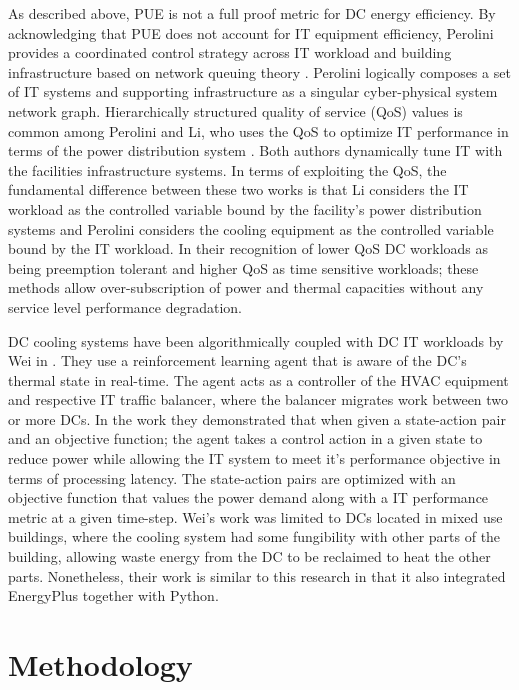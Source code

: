 As described above, PUE is not a full proof metric for DC energy efficiency. By acknowledging that PUE does not account for IT equipment efficiency, Perolini provides a coordinated control strategy across IT workload and building infrastructure based on network queuing theory \citep{parolini12}. Perolini logically composes a set of IT systems and supporting infrastructure as a singular cyber-physical system network graph. Hierarchically structured quality of service (QoS) values is common among Perolini and Li, who uses the QoS to optimize IT performance in terms of the power distribution system \citep{Li18}. Both authors dynamically tune IT with the facilities infrastructure systems. In terms of exploiting the QoS,  the fundamental difference between these two works is that Li considers the IT workload as the controlled variable bound by the facility's power distribution systems and Perolini considers the cooling equipment as the controlled variable bound by the IT workload. In their recognition of lower QoS DC workloads as being preemption tolerant and higher QoS as time sensitive workloads; these methods allow over-subscription of power and thermal capacities without any service level performance degradation. 

DC cooling systems have been algorithmically coupled with DC IT workloads by Wei in \citep{wei17}. They use a reinforcement learning agent that is aware of the DC's thermal state in real-time. The agent acts as a controller of the HVAC equipment and respective IT traffic balancer, where the balancer migrates work between two or more DCs. In the work they demonstrated that when given a state-action pair and an objective function; the agent takes a control action in a given state to reduce power while allowing the IT system to meet it's performance objective in terms of processing latency. The state-action pairs are optimized with an objective function that values the power demand along with a IT performance metric at a given time-step. Wei's work was limited to DCs located in mixed use buildings, where the cooling system had some fungibility with other parts of the building, allowing waste energy from the DC to be reclaimed to heat the other parts. Nonetheless, their work is similar to this research in that it also integrated EnergyPlus together with Python.

\section{Methodology}

